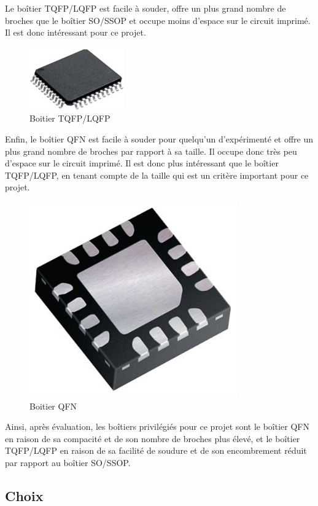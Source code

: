 Le boîtier TQFP/LQFP est facile à souder, offre un plus grand nombre de broches que le boîtier SO/SSOP et occupe moins d'espace sur le circuit imprimé.
Il est donc intéressant pour ce projet.

\begin{figure}[H]
    \centering
    \includegraphics[scale=0.4]{./assets/figures/tqfp_lqfp.jpg}
    \caption{\cite{tqfp_lqfp} Boitier TQFP/LQFP}
\end{figure}

Enfin, le boîtier QFN est facile à souder pour quelqu'un d'expérimenté et offre un plus grand nombre de broches par rapport à sa taille.
Il occupe donc très peu d'espace sur le circuit imprimé.
Il est donc plus intéressant que le boîtier TQFP/LQFP, en tenant compte de la taille qui est un critère important pour ce projet.

\begin{figure}[H]
    \centering
    \includegraphics[scale=0.5]{./assets/figures/qfn.png}
    \caption{\cite{qfn} Boitier QFN}
\end{figure}

Ainsi, après évaluation, les boîtiers privilégiés pour ce projet sont le boîtier QFN en raison de sa compacité et de son nombre de broches plus élevé, et le boîtier TQFP/LQFP en raison de sa facilité de soudure et de son encombrement réduit par rapport au boîtier SO/SSOP.

\subsection{Choix}

